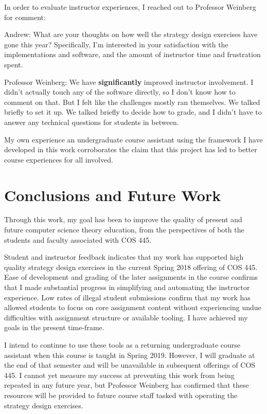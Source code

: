 \documentclass[pageno]{jpaper}
\begin{document}
In order to evaluate instructor experiences, I reached out to Professor Weinberg for comment:
\begin{displayquote}
Andrew: What are your thoughts on how well the strategy design exercises have gone this year? Specifically, I'm interested in your satisfaction with the implementations and software, and the amount of instructor time and frustration spent.

Professor Weinberg: We have \textbf{significantly} improved instructor involvement.
I didn't actually touch any of the software directly, so I don't know how to comment on that.
But I felt like the challenges mostly ran themselves.
We talked briefly to set it up.
We talked briefly to decide how to grade, and I didn't have to answer any technical questions for students in between.
\end{displayquote}
My own experience an undergraduate course assistant using the framework I have developed in this work corroborates the claim that this project has led to better course experiences for all involved.

\section*{Conclusions and Future Work}
Through this work, my goal has been to improve the quality of present and future computer science theory education, from the perspectives of both the students and faculty associated with COS 445.

Student and instructor feedback indicates that my work has supported high quality strategy design exercises in the current Spring 2018 offering of COS 445.
Ease of development and grading of the later assignments in the course confirms that I made substantial progress in simplifying and automating the instructor experience.
Low rates of illegal student submissions confirm that my work has allowed students to focus on core assignment content without experiencing undue difficulties with assignment structure or available tooling.
I have achieved my goals in the present time-frame.

I intend to continue to use these tools as a returning undergraduate course assistant when this course is taught in Spring 2019.
However, I will graduate at the end of that semester and will be unavailable in subsequent offerings of COS 445.
I cannot yet measure my success at preventing this work from being repeated in any future year, but Professor Weinberg has confirmed that these resources will be provided to future course staff tasked with operating the strategy design exercises.
\end{document}
